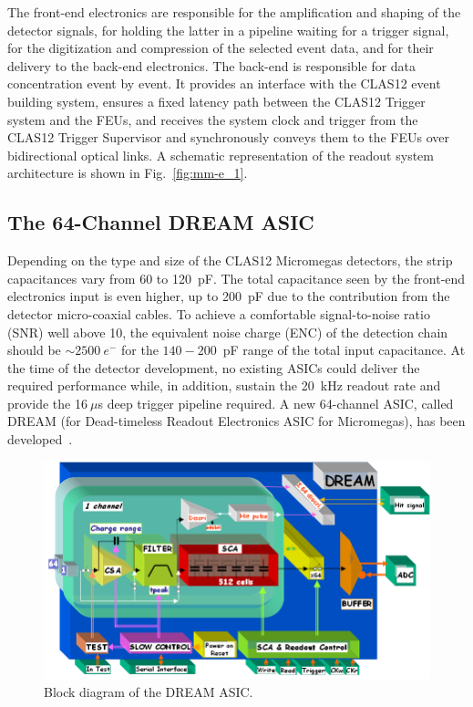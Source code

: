 The front-end electronics are responsible for the amplification and shaping of the detector signals, for holding the latter
in a pipeline waiting for a trigger signal, for the digitization and compression of the selected event data, and for their
delivery to the back-end electronics. The back-end is responsible for data concentration event by event. It provides an
interface with the CLAS12 event building system, ensures a fixed latency path between the CLAS12 Trigger system
\cite{trigger-nim}  and the FEUs, and receives the system clock and trigger from the CLAS12 Trigger Supervisor and
synchronously conveys them to the FEUs over bidirectional optical links. A schematic representation of the readout system
architecture is  shown in Fig.~\ref{fig:mm-e_1}.

\subsection{The 64-Channel DREAM ASIC}

Depending on the type and size of the CLAS12 Micromegas detectors, the strip capacitances vary from 60 to 120~pF. The
total capacitance seen by the front-end electronics input is even higher, up to 200~pF due to the contribution from the
detector micro-coaxial cables. To achieve a comfortable signal-to-noise ratio (SNR) well above 10, the equivalent noise
charge (ENC) of the detection chain should be $\sim2500~e^-$ for the $140-200$~pF range of the total input
capacitance. At the time of the detector development, no existing ASICs could deliver the required performance while, in
addition, sustain the 20~kHz readout rate and provide the 16$~\mu$s deep trigger pipeline required. A new 64-channel
ASIC, called DREAM (for Dead-timeless Readout Electronics ASIC for Micromegas), has been developed~\cite{DRM}. 

\begin{figure}[htb]
\centering
 \includegraphics[width=.8\textwidth,keepaspectratio]{images/electronics_fig2.png}
 \caption{Block diagram of the DREAM ASIC.}
 \label{fig:mm-e_2}
\end{figure}

